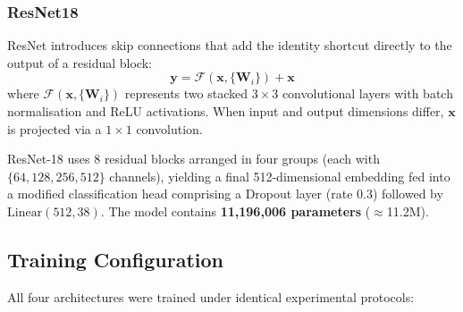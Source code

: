 \documentclass[pdflatex,sn-mathphys-num]{sn-jnl}
\theoremstyle{thmstyleone}%
\theoremstyle{thmstyletwo}%
\theoremstyle{thmstylethree}%
\begin{document}
\subsubsection{ResNet18}

ResNet \citep{he2016resnet} introduces skip connections that add the identity shortcut
directly to the output of a residual block:
\begin{equation}
  \mathbf{y} = \mathcal{F}(\mathbf{x}, \{\mathbf{W}_i\}) + \mathbf{x}
  \label{eq:residual}
\end{equation}
where $\mathcal{F}(\mathbf{x}, \{\mathbf{W}_i\})$ represents two stacked
$3\times3$ convolutional layers with batch normalisation and ReLU activations. When
input and output dimensions differ, $\mathbf{x}$ is projected via a $1\times1$
convolution.

ResNet-18 uses 8 residual blocks arranged in four groups (each with $\{64, 128, 256, 512\}$ channels), yielding a final 512-dimensional embedding fed into a modified
classification head comprising a Dropout layer (rate 0.3) followed by
$\text{Linear}(512, 38)$. The model contains \textbf{11{,}196{,}006 parameters}
($\approx$11.2M).

\subsection{Training Configuration}
\label{sec:training_config}

All four architectures were trained under identical experimental protocols:
\end{document}
